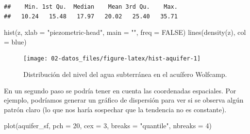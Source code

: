 \documentclass[
  spanish,
]{book}
\newenvironment{Shaded}{\begin{snugshade}}{\end{snugshade}}
\newcommand{\AttributeTok}[1]{\textcolor[rgb]{0.77,0.63,0.00}{#1}}
\newcommand{\ConstantTok}[1]{\textcolor[rgb]{0.00,0.00,0.00}{#1}}
\newcommand{\DecValTok}[1]{\textcolor[rgb]{0.00,0.00,0.81}{#1}}
\newcommand{\FunctionTok}[1]{\textcolor[rgb]{0.00,0.00,0.00}{#1}}
\newcommand{\NormalTok}[1]{#1}
\newcommand{\OtherTok}[1]{\textcolor[rgb]{0.56,0.35,0.01}{#1}}
\newcommand{\SpecialCharTok}[1]{\textcolor[rgb]{0.00,0.00,0.00}{#1}}
\newcommand{\StringTok}[1]{\textcolor[rgb]{0.31,0.60,0.02}{#1}}
\theoremstyle{break}
\theoremstyle{definition}
\theoremstyle{definition}
\theoremstyle{definition}
\theoremstyle{definition}
\theoremstyle{remark}
\begin{document}
\begin{Shaded}
\end{Shaded}

\begin{verbatim}
##    Min. 1st Qu.  Median    Mean 3rd Qu.    Max. 
##   10.24   15.48   17.97   20.02   25.40   35.71
\end{verbatim}

\begin{Shaded}
\begin{Highlighting}[]
\FunctionTok{hist}\NormalTok{(z, }\AttributeTok{xlab =} \StringTok{"piezometric{-}head"}\NormalTok{, }\AttributeTok{main =} \StringTok{""}\NormalTok{, }\AttributeTok{freq =} \ConstantTok{FALSE}\NormalTok{)}
\FunctionTok{lines}\NormalTok{(}\FunctionTok{density}\NormalTok{(z), }\AttributeTok{col =} \StringTok{\textquotesingle{}blue\textquotesingle{}}\NormalTok{)}
\end{Highlighting}
\end{Shaded}

\begin{figure}[!htb]

{\centering \texttt{[image: 02-datos\_files/figure-latex/hist-aquifer-1]} 

}

\caption{Distribución del nivel del agua subterránea en el acuífero Wolfcamp.}\label{fig:hist-aquifer}
\end{figure}

En un segundo paso se podría tener en cuenta las coordenadas espaciales.
Por ejemplo, podríamos generar un gráfico de dispersión para ver si se observa algún patrón claro (lo que nos haría sospechar que la tendencia no es constante).

\begin{Shaded}
\begin{Highlighting}[]
\FunctionTok{plot}\NormalTok{(aquifer\_sf, }\AttributeTok{pch =} \DecValTok{20}\NormalTok{, }\AttributeTok{cex =} \DecValTok{3}\NormalTok{, }\AttributeTok{breaks =} \StringTok{"quantile"}\NormalTok{, }\AttributeTok{nbreaks =} \DecValTok{4}\NormalTok{)}
\end{Highlighting}
\end{Shaded}
\end{document}
